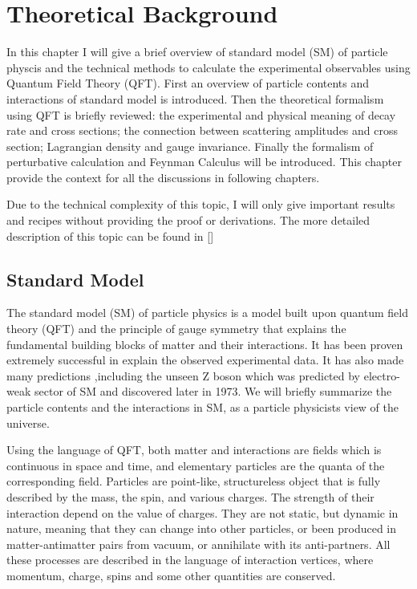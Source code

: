 
\chapter{Theoretical Background}
\label{sec:theory}

In this chapter I will give a brief overview of standard model (SM) of particle physcis and the technical methods to calculate the experimental observables using Quantum Field Theory (QFT). First an overview of particle contents and interactions of standard model is introduced. Then the theoretical formalism using QFT is briefly reviewed: the experimental and physical meaning of decay rate and cross sections; the connection between scattering amplitudes and cross section; Lagrangian density and gauge invariance. Finally the formalism of perturbative calculation and Feynman Calculus will be introduced. This chapter provide the context for all the discussions in following chapters.

Due to the technical complexity of this topic, I will only give important results and recipes without providing the proof or derivations. The more detailed description of this topic can be found in [\cite{Peskin, PDG, Griffith}]


\section{Standard Model}
\label{sec:1.2}
The standard model (SM) of particle physics is a model built upon quantum field theory (QFT) and the principle of gauge symmetry that explains the fundamental building blocks of matter and their interactions. It has been proven extremely successful in explain the observed experimental data. It has also made many predictions ,including the unseen Z boson which was predicted by electro-weak sector of SM and discovered later in 1973. We will briefly summarize the particle contents and the interactions in SM, as a particle physicists view of the universe.

Using the language of QFT, both matter and interactions are fields which is continuous in space and time, and elementary particles are the quanta of the corresponding field. Particles are point-like, structureless object that is fully described by the mass, the spin, and various charges. The strength of their interaction depend on the value of charges. They are not static, but dynamic in nature, meaning that they can change into other particles, or been produced in matter-antimatter pairs from vacuum, or annihilate with its anti-partners. All these processes are described in the language of interaction vertices, where momentum, charge, spins and some other quantities are conserved. 

